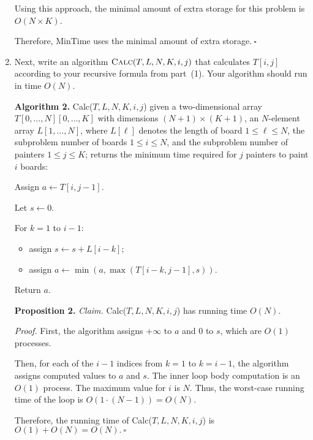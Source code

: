 \begin{enumerate}
\begin{solution}
Using this approach, the minimal amount of extra storage for this problem is $O(N\times K)$. 

Therefore, {\sc MinTime} uses the minimal amount of extra storage.$~\square$
\end{solution}
\newpage
\item Next, write an algorithm $\text{\sc Calc}(T,L,N,K,i,j)$ that calculates $T[i,j]$
according to your recursive formula from part~(1). Your algorithm should run in time $O(N)$.
\begin{solution}

\textbf{Algorithm 2. }{\sc Calc}($T,L,N,K,i,j$) given a two-dimensional array $T[0,\dots,N][0,\dots,K]$ with dimensions  $(N+1)\times (K+1)$, an $N$-element array $L[1,\dots,N]$, where $L[\ell]$ denotes the length of board $1\leq\ell\leq N$, the subproblem number of boards $1\leq i\leq N$, and the subproblem number of painters $1\leq j\leq K$; returns the minimum time required for $j$ painters to paint $i$ boards:

Assign $a\leftarrow T[i,j-1]$.

Let $s\leftarrow 0$.

For $k=1$ to $i-1$:
\begin{itemize}
\item assign $s\leftarrow s+L[i-k]$;
\item assign $a\leftarrow\min(a,\max(T[i-k,j-1],s))$.
\end{itemize}
Return $a$.

\textbf{Proposition 2. }\textit{Claim. }{\sc Calc}($T,L,N,K,i,j$) has running time $O(N)$.

\textit{Proof. }First, the algorithm assigns $+\infty$ to $a$ and $0$ to $s$, which are $O(1)$ processes.

Then, for each of the $i-1$ indices from $k=1$ to $k=i-1$, the algorithm assigns computed values to $a$ and $s$. The inner loop body computation is an $O(1)$ process. The maximum value for $i$ is $N$. Thus, the worst-case running time of the loop is $O(1\cdot(N-1))=O(N)$.

Therefore, the running time of {\sc Calc}($T,L,N,K,i,j$) is $O(1)+O(N)=O(N).~\square$
\end{solution}
\end{enumerate}